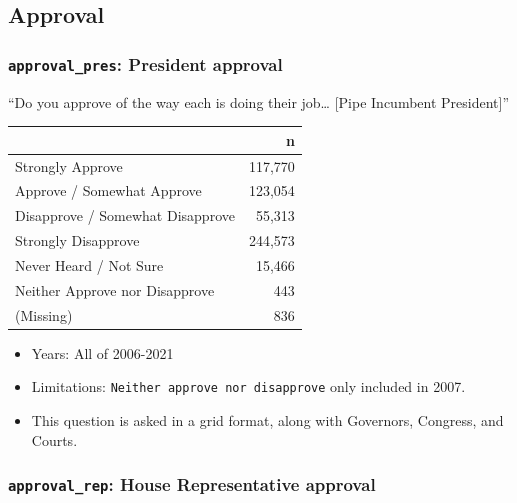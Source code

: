 \documentclass[10pt,article,oneside]{memoir}
\theoremstyle{definition}
\begin{document}
\hypertarget{approval}{%
\subsection{Approval}\label{approval}}

\hypertarget{approval_pres-president-approval}{%
\subsubsection{\texorpdfstring{\texttt{approval\_pres}: President
approval}{approval\_pres: President approval}}\label{approval_pres-president-approval}}

``Do you approve of the way each is doing their job\ldots{} {[}Pipe
Incumbent President{]}''

\begin{table}[H]
\centering
\begin{tabular}[t]{lr}
\toprule
 & n\\
\midrule
Strongly Approve & 117,770\\
Approve / Somewhat Approve & 123,054\\
Disapprove / Somewhat Disapprove & 55,313\\
Strongly Disapprove & 244,573\\
Never Heard / Not Sure & 15,466\\
Neither Approve nor Disapprove & 443\\
(Missing) & 836\\
\bottomrule
\end{tabular}
\end{table}

\begin{itemize}
\tightlist
\item
  Years: All of 2006-2021
\item
  Limitations: \texttt{Neither\ approve\ nor\ disapprove} only included
  in 2007.
\item
  This question is asked in a grid format, along with Governors,
  Congress, and Courts.
\end{itemize}

\hypertarget{approval_rep-house-representative-approval}{%
\subsubsection{\texorpdfstring{\texttt{approval\_rep}: House
Representative
approval}{approval\_rep: House Representative approval}}\label{approval_rep-house-representative-approval}}
\end{document}

